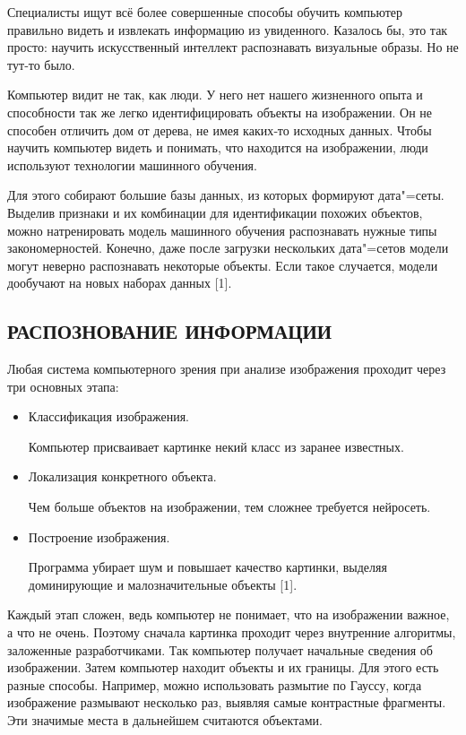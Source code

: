 \documentclass[bachelor, och, referat, times]{SCWorks}
\begin{document}
Специалисты ищут всё более совершенные способы обучить компьютер правильно видеть и извлекать информацию из увиденного. Казалось бы, это так просто: научить искусственный интеллект распознавать визуальные образы. Но не тут‑то было.

Компьютер видит не так, как люди. У него нет нашего жизненного опыта и способности так же легко идентифицировать объекты на изображении. Он не способен отличить дом от дерева, не имея каких‑то исходных данных. Чтобы научить компьютер видеть и понимать, что находится на изображении, люди используют технологии машинного обучения.

Для этого собирают большие базы данных, из которых формируют дата"=сеты. Выделив признаки и их комбинации для идентификации похожих объектов, можно натренировать модель машинного обучения распознавать нужные типы закономерностей. Конечно, даже после загрузки нескольких дата"=сетов модели могут неверно распознавать некоторые объекты. Если такое случается, модели дообучают на новых наборах данных [1].

\subsection{РАСПОЗНОВАНИЕ ИНФОРМАЦИИ}
Любая система компьютерного зрения при анализе изображения проходит через три основных этапа: 

\begin{itemize}
\item Классификация изображения. 

Компьютер присваивает картинке некий класс из заранее известных. 

\item Локализация конкретного объекта. 

Чем больше объектов на изображении, тем сложнее требуется нейросеть. 

\item Построение изображения. 

Программа убирает шум и повышает качество картинки, выделяя доминирующие и малозначительные объекты [1].
\end{itemize}

Каждый этап сложен, ведь компьютер не понимает, что на изображении важное, а что не очень. Поэтому сначала картинка проходит через внутренние алгоритмы, заложенные разработчиками. Так компьютер получает начальные сведения об изображении. Затем компьютер находит объекты и их границы. Для этого есть разные способы. Например, можно использовать размытие по Гауссу, когда изображение размывают несколько раз, выявляя самые контрастные фрагменты. Эти значимые места в дальнейшем считаются объектами. 
\end{document}
